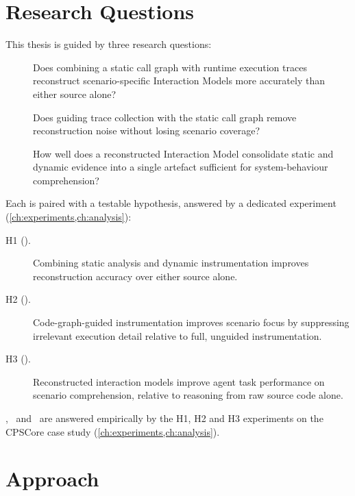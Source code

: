 \section{Research Questions}

This thesis is guided by three research questions:

\begin{description}
  \item[\rqone] Does combining a static call graph with runtime execution
    traces reconstruct scenario-specific Interaction Models more
    accurately than either source alone?

  \item[\rqtwo] Does guiding trace collection with the static call graph
    remove reconstruction noise without losing scenario coverage?

  \item[\rqthree] How well does a reconstructed \sysml Interaction Model
    consolidate static and dynamic evidence into a single artefact
    sufficient for system-behaviour comprehension?
\end{description}

Each is paired with a testable hypothesis, answered by a dedicated
experiment (\cref{ch:experiments,ch:analysis}):

\begin{description}
  \item[H1 (\rqone).] Combining static analysis and dynamic instrumentation
    improves reconstruction accuracy over either source alone.
  \item[H2 (\rqtwo).] Code-graph-guided instrumentation improves scenario
    focus by suppressing irrelevant execution detail relative to full,
    unguided instrumentation.
  \item[H3 (\rqthree).] Reconstructed interaction models improve agent task
    performance on scenario comprehension, relative to reasoning from raw
    source code alone.
\end{description}

\rqone, \rqtwo\ and \rqthree\ are answered empirically by the H1, H2 and
H3 experiments on the CPSCore case study (\cref{ch:experiments,ch:analysis}).

\section{Approach}

